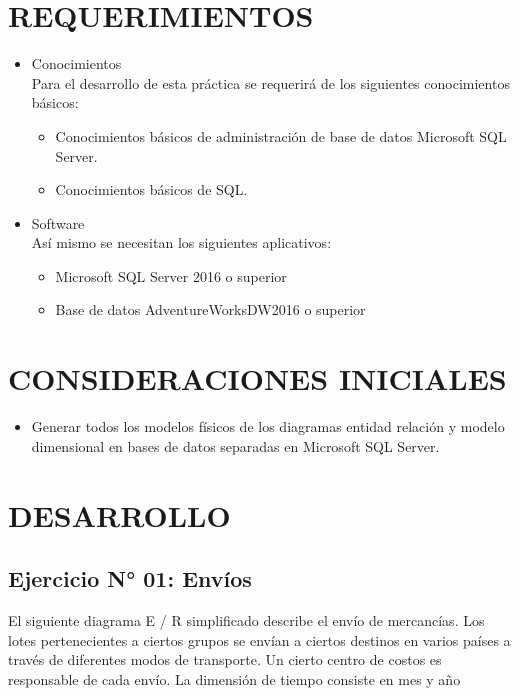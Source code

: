 \documentclass[12pt,letterpaper]{article}
\begin{document}
\section{REQUERIMIENTOS}
\begin{itemize}
    \item Conocimientos\\
          Para el desarrollo de esta práctica se requerirá de los siguientes conocimientos básicos:
          \begin{itemize}
              \item Conocimientos básicos de administración de base de datos Microsoft SQL Server.
              \item Conocimientos básicos de SQL.
          \end{itemize}
    \item Software\\
          Así mismo se necesitan los siguientes aplicativos:
          \begin{itemize}
              \item Microsoft SQL Server 2016 o superior
              \item Base de datos AdventureWorksDW2016 o superior
          \end{itemize}
\end{itemize}

\section{CONSIDERACIONES INICIALES}
\begin{itemize}
    \item Generar todos los modelos físicos de los diagramas entidad relación y modelo dimensional en bases de datos separadas en Microsoft SQL Server.
\end{itemize}

\newpage
\section{DESARROLLO}
\subsection{Ejercicio N° 01: Envíos}
El siguiente diagrama E / R simplificado describe el envío de mercancías. Los lotes pertenecientes a ciertos grupos se envían a ciertos destinos en varios países a través de diferentes modos de transporte. Un cierto centro de costos es responsable de cada envío. La dimensión de tiempo consiste en mes y año
\end{document}

